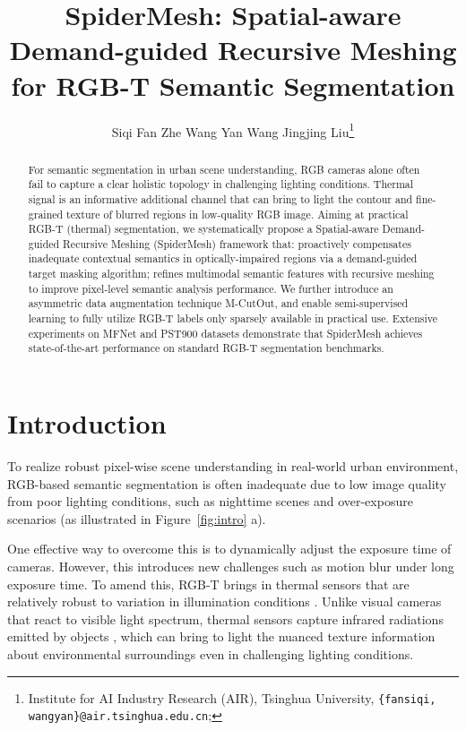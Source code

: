 \documentclass[letterpaper, 10 pt, conference]{ieeeconf}
\title{\LARGE \bf
SpiderMesh: Spatial-aware Demand-guided Recursive Meshing \\for RGB-T Semantic Segmentation
}
\author{Siqi Fan  Zhe Wang  Yan Wang Jingjing Liu\thanks{ Institute for AI Industry Research (AIR), Tsinghua University, {\tt\small \{fansiqi, wangyan\}@air.tsinghua.edu.cn};}
}
\begin{document}
\maketitle
\thispagestyle{empty}
\pagestyle{empty}


\begin{abstract}

For semantic segmentation in urban scene understanding, RGB cameras alone often fail to capture a clear holistic topology in challenging lighting conditions. Thermal signal is an informative additional channel that can bring to light the contour and fine-grained texture of blurred regions in low-quality RGB image. Aiming at practical RGB-T (thermal) segmentation, we systematically propose a Spatial-aware Demand-guided Recursive Meshing (SpiderMesh) framework that:  proactively compensates inadequate contextual semantics in optically-impaired regions via a demand-guided target masking algorithm;  refines multimodal semantic features with recursive meshing to improve pixel-level semantic analysis performance. We further introduce an asymmetric data augmentation technique M-CutOut, and enable semi-supervised learning to fully utilize RGB-T labels only sparsely available in practical use. Extensive experiments on MFNet and PST900 datasets demonstrate that SpiderMesh achieves state-of-the-art performance on standard RGB-T segmentation benchmarks.

\end{abstract}


\section{Introduction}

To realize robust pixel-wise scene understanding in real-world urban environment, RGB-based semantic segmentation is often inadequate due to low image quality from poor lighting conditions, such as nighttime scenes and over-exposure scenarios (as illustrated in Figure~\ref{fig:intro} a). 

One effective way to overcome this is to dynamically adjust the exposure time of cameras. However, this introduces new challenges such as motion blur under long exposure time. To amend this, RGB-T brings in thermal sensors that are relatively robust to variation in illumination conditions \cite{mfnet, rtfnet, fuseseg, feanet, gmnet, mffenet, ABMDRNet, mitigating, 10103760, li2022rgb, 9987529, zhou2022mtanet, Zhang_2023_CVPR}. Unlike visual cameras that react to visible light spectrum, thermal sensors capture infrared radiations emitted by objects \cite{ITI}, which can bring to light the nuanced texture information about environmental surroundings even in challenging lighting conditions. 
\end{document}
